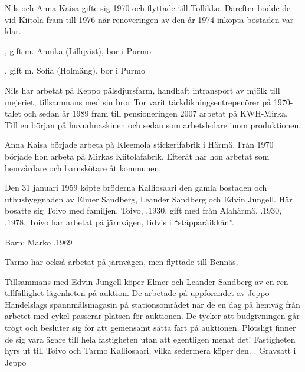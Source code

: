 Nils och Anna Kaisa gifte sig 1970 och flyttade till Tollikko. Därefter bodde de vid Kiitola fram till 1976 när renoveringen av den år 1974
inköpta bostaden var klar.
\begin{jhchildren}
  \item {}, gift m. Annika (Lillqvist), bor i Purmo
  \item {}, gift m. Sofia (Holmäng), bor i Purmo
\end{jhchildren}
Nils har arbetat på Keppo pälsdjursfarm, handhaft intransport av mjölk till mejeriet, tillsammans med sin bror Tor varit täckdikningsentrepenörer på 1970-talet och sedan år 1989 fram till pensioneringen 2007 arbetat på KWH-Mirka. Till en början på huvudmaskinen och sedan som arbetsledare inom produktionen.

Anna Kaisa började arbeta på Kleemola stickerifabrik i Härmä. Från 1970 började hon arbeta på Mirkas Kiitolafabrik. Efteråt har hon arbetat som hemvårdare och barnskötare åt kommunen.



Den 31 januari 1959 köpte bröderna Kalliosaari den gamla bostaden och uthusbyggnaden av Elmer Sandberg, Leander Sandberg och Edvin Jungell. Här bosatte sig Toivo med familjen. Toivo, .1930, gift med  från Alahärmä, .1930, .1978. Toivo har arbetat på järnvägen, tidvis i ``ståpparåikkån''.

Barn; Marko .1969

Tarmo har också arbetat på järnvägen, men flyttade till Bennäs.


Tillsammans med Edvin Jungell köper Elmer och Leander Sandberg av en ren tillfällighet lägenheten på auktion. De arbetade på uppförandet av Jeppo Handelslags spannmålsmagasin på stationsområdet när de en dag på hemväg från arbetet med cykel passerar platsen för auktionen. De tycker att budgivningen går trögt och besluter sig för att gemensamt sätta fart på auktionen. Plötsligt finner de sig vara ägare till hela fastigheten utan att egentligen menat det! Fastigheten hyrs ut till Toivo och Tarmo Kalliosaari, vilka sedermera köper den.
. Gravsatt i Jeppo


